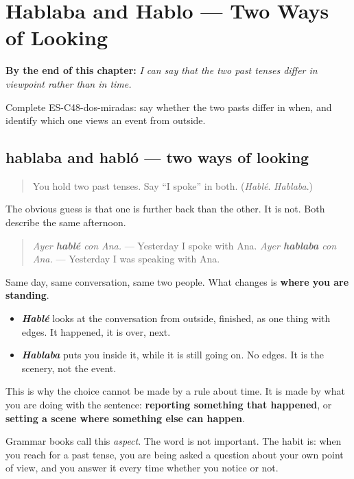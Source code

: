 
\chapter{Hablaba and Hablo --- Two Ways of Looking}
\label{ch:aspect-not-time}

\begin{chapteropening}
\textbf{By the end of this chapter:} \emph{I can say that the two past tenses differ in viewpoint rather than in time.}

Complete ES-C48-dos-miradas: say whether the two pasts differ in when, and identify which one views an event from outside.
\end{chapteropening}

\section[hablaba / habló]{hablaba and habló — two ways of looking}

\label{lesson:ES-C48-dos-miradas}



\begin{quote}
You hold two past tenses. Say \textquotedblleft{}I spoke\textquotedblright{} in both. (\emph{Hablé}. \emph{Hablaba}.)
\end{quote}

\begin{grammarlens}[title={Grammar Lens: not two times — two viewpoints}]
The obvious guess is that one is further back than the other. It is not. Both describe the same afternoon.

\begin{quote}
\emph{Ayer \textbf{hablé} con Ana.} — Yesterday I spoke with Ana. \emph{Ayer \textbf{hablaba} con Ana.} — Yesterday I was speaking with Ana.
\end{quote}

Same day, same conversation, same two people. What changes is \textbf{where you are standing}.

\begin{itemize}
\raggedright
  \item \emph{\textbf{Hablé}} looks at the conversation from outside, finished, as one thing with edges. It happened, it is over, next.
  \item \emph{\textbf{Hablaba}} puts you inside it, while it is still going on. No edges. It is the scenery, not the event.
\end{itemize}

This is why the choice cannot be made by a rule about time. It is made by what you are doing with the sentence: \textbf{reporting something that happened}, or \textbf{setting a scene where something else can happen}.

Grammar books call this \emph{aspect}. The word is not important. The habit is: when you reach for a past tense, you are being asked a question about your own point of view, and you answer it every time whether you notice or not.
\end{grammarlens}

